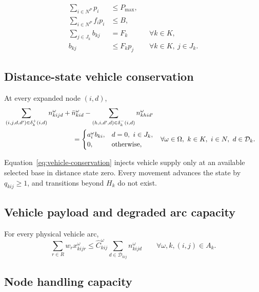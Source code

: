 \documentclass[11pt]{article}
\begin{document}
\begin{align}
\sum_{i\in N^P}p_i
&\leq P_{\max},
\label{eq:site-limit}\\
\sum_{i\in N^P}f_i p_i
&\leq B,
\label{eq:activation-budget}\\
\sum_{j\in J_k}b_{kj}
&=F_k
&&\forall k\in K,
\label{eq:fleet-assignment}\\
b_{kj}
&\leq F_k p_j
&&\forall k\in K,\ j\in J_k.
\label{eq:base-link}
\end{align}

\subsection{Distance-state vehicle conservation}

At every expanded node $(i,d)$,
\begin{align}
&\sum_{(i,j,d,d')\in\delta_k^+(i,d)}
n^\omega_{kijd}
+\bar n^\omega_{kid}
-\sum_{(h,i,d',d)\in\delta_k^-(i,d)}
n^\omega_{khid'}
\nonumber\\
&\hspace{35mm}=
\begin{cases}
a^\omega_i b_{ki},
& d=0,\ i\in J_k,\\
0,&\text{otherwise},
\end{cases}
&&\forall\omega\in\Omega,\ k\in K,\ i\in N,\ d\in\mathcal D_k.
\label{eq:vehicle-conservation}
\end{align}

Equation~\eqref{eq:vehicle-conservation} injects vehicle supply only at an
available selected base in distance state zero.  Every movement advances the
state by $q_{kij}\geq1$, and transitions beyond $H_k$ do not exist.

\subsection{Vehicle payload and degraded arc capacity}

For every physical vehicle arc,
\begin{equation}
\sum_{r\in R}w_r x^\omega_{kijr}
\leq
\widehat C^\omega_{kij}
\sum_{d\in\mathcal D_{kij}}n^\omega_{kijd}
\qquad
\forall\omega,k,(i,j)\in A_k.
\label{eq:vehicle-capacity}
\end{equation}

\subsection{Node handling capacity}
\end{document}
